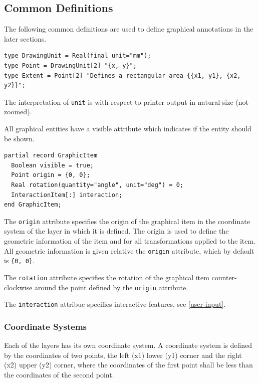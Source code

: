 \subsection{Common Definitions}\label{common-definitions}

The following common definitions are used to define graphical annotations in the later sections.
\begin{lstlisting}[language=modelica]
type DrawingUnit = Real(final unit="mm");
type Point = DrawingUnit[2] "{x, y}";
type Extent = Point[2] "Defines a rectangular area {{x1, y1}, {x2, y2}}";
\end{lstlisting}%
The interpretation of \lstinline!unit! is with respect to printer output in natural size (not zoomed).

All graphical entities have a visible attribute which indicates if the entity should be shown.
\begin{lstlisting}[language=modelica]
partial record GraphicItem
  Boolean visible = true;
  Point origin = {0, 0};
  Real rotation(quantity="angle", unit="deg") = 0;
  InteractionItem[:] interaction;
end GraphicItem;
\end{lstlisting}%
The \lstinline!origin! attribute specifies the origin of the graphical item in the coordinate system of the layer in which it is defined.
The origin is used to define the geometric information of the item and for all transformations applied to the item.
All geometric information is given relative the \lstinline!origin! attribute, which by default is \lstinline!{0, 0}!.

The \lstinline!rotation! attribute specifies the rotation of the graphical item counter-clockwise around the point defined by the \lstinline!origin! attribute.

The \lstinline!interaction! attribue specifies interactive features, see \cref{user-input}.

\subsubsection{Coordinate Systems}\label{coordinate-systems}

Each of the layers has its own coordinate system.
A coordinate system is defined by the coordinates of two points, the left (x1) lower (y1) corner and the right (x2) upper (y2) corner, where the coordinates of the first point shall be less than the coordinates of the second point.

